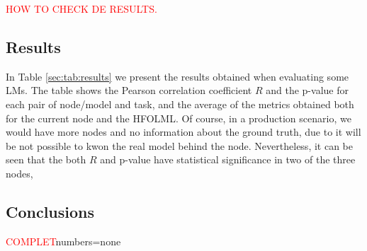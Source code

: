 \textcolor{red}{HOW TO CHECK DE RESULTS.}


\subsection{Results}

In Table \ref{sec:tab:results} we present the results obtained when evaluating some \glspl{LM}. 
The table shows the Pearson correlation coefficient $R$ and the p-value for each pair of node/model and task, and the average of the metrics obtained both for the current node and the \gls{HFOLML}. 
Of course, in a production scenario, we would have more nodes and no information about the ground truth, due to it will be not possible to kwon the real model behind the node. 
Nevertheless, it can be seen that the both $R$ and p-value have statistical significance in two of the three nodes, 

\begin{table}[htb!]
    \caption{Results obtained with the \gls{MLTB} and those published in the \gls{HFOLML}.}
    \label{sec:tab:results}
    \centering
\end{table}


\subsection{Conclusions}
\textcolor{red}{COMPLET}numbers=none